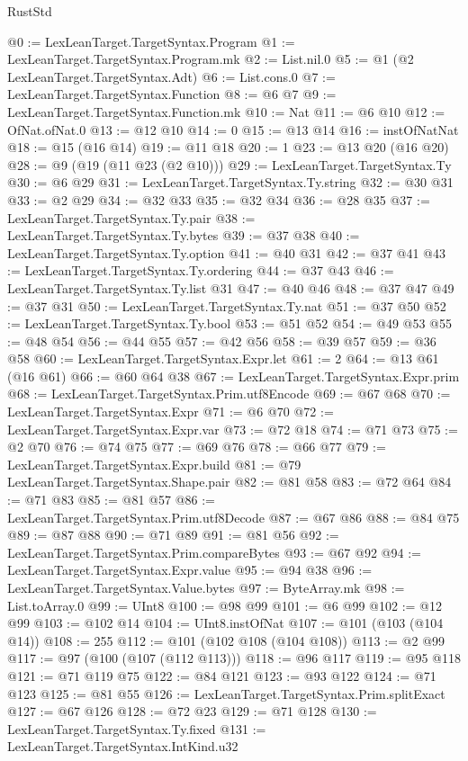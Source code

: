 \begin{lexlean}{RustStd}
\begin{coremodule}
@0 := LexLeanTarget.TargetSyntax.Program
@1 := LexLeanTarget.TargetSyntax.Program.mk
@2 := List.nil.{0}
@5 := @1 (@2 LexLeanTarget.TargetSyntax.Adt)
@6 := List.cons.{0}
@7 := LexLeanTarget.TargetSyntax.Function
@8 := @6 @7
@9 := LexLeanTarget.TargetSyntax.Function.mk
@10 := Nat
@11 := @6 @10
@12 := OfNat.ofNat.{0}
@13 := @12 @10
@14 := 0
@15 := @13 @14
@16 := instOfNatNat
@18 := @15 (@16 @14)
@19 := @11 @18
@20 := 1
@23 := @13 @20 (@16 @20)
@28 := @9 (@19 (@11 @23 (@2 @10)))
@29 := LexLeanTarget.TargetSyntax.Ty
@30 := @6 @29
@31 := LexLeanTarget.TargetSyntax.Ty.string
@32 := @30 @31
@33 := @2 @29
@34 := @32 @33
@35 := @32 @34
@36 := @28 @35
@37 := LexLeanTarget.TargetSyntax.Ty.pair
@38 := LexLeanTarget.TargetSyntax.Ty.bytes
@39 := @37 @38
@40 := LexLeanTarget.TargetSyntax.Ty.option
@41 := @40 @31
@42 := @37 @41
@43 := LexLeanTarget.TargetSyntax.Ty.ordering
@44 := @37 @43
@46 := LexLeanTarget.TargetSyntax.Ty.list @31
@47 := @40 @46
@48 := @37 @47
@49 := @37 @31
@50 := LexLeanTarget.TargetSyntax.Ty.nat
@51 := @37 @50
@52 := LexLeanTarget.TargetSyntax.Ty.bool
@53 := @51 @52
@54 := @49 @53
@55 := @48 @54
@56 := @44 @55
@57 := @42 @56
@58 := @39 @57
@59 := @36 @58
@60 := LexLeanTarget.TargetSyntax.Expr.let
@61 := 2
@64 := @13 @61 (@16 @61)
@66 := @60 @64 @38
@67 := LexLeanTarget.TargetSyntax.Expr.prim
@68 := LexLeanTarget.TargetSyntax.Prim.utf8Encode
@69 := @67 @68
@70 := LexLeanTarget.TargetSyntax.Expr
@71 := @6 @70
@72 := LexLeanTarget.TargetSyntax.Expr.var
@73 := @72 @18
@74 := @71 @73
@75 := @2 @70
@76 := @74 @75
@77 := @69 @76
@78 := @66 @77
@79 := LexLeanTarget.TargetSyntax.Expr.build
@81 := @79 LexLeanTarget.TargetSyntax.Shape.pair
@82 := @81 @58
@83 := @72 @64
@84 := @71 @83
@85 := @81 @57
@86 := LexLeanTarget.TargetSyntax.Prim.utf8Decode
@87 := @67 @86
@88 := @84 @75
@89 := @87 @88
@90 := @71 @89
@91 := @81 @56
@92 := LexLeanTarget.TargetSyntax.Prim.compareBytes
@93 := @67 @92
@94 := LexLeanTarget.TargetSyntax.Expr.value
@95 := @94 @38
@96 := LexLeanTarget.TargetSyntax.Value.bytes
@97 := ByteArray.mk
@98 := List.toArray.{0}
@99 := UInt8
@100 := @98 @99
@101 := @6 @99
@102 := @12 @99
@103 := @102 @14
@104 := UInt8.instOfNat
@107 := @101 (@103 (@104 @14))
@108 := 255
@112 := @101 (@102 @108 (@104 @108))
@113 := @2 @99
@117 := @97 (@100 (@107 (@112 @113)))
@118 := @96 @117
@119 := @95 @118
@121 := @71 @119 @75
@122 := @84 @121
@123 := @93 @122
@124 := @71 @123
@125 := @81 @55
@126 := LexLeanTarget.TargetSyntax.Prim.splitExact
@127 := @67 @126
@128 := @72 @23
@129 := @71 @128
@130 := LexLeanTarget.TargetSyntax.Ty.fixed
@131 := LexLeanTarget.TargetSyntax.IntKind.u32

\end{coremodule}
\end{lexlean}
